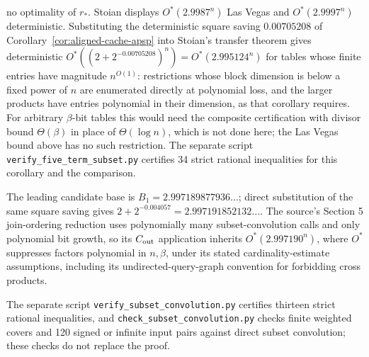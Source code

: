\documentclass[11pt]{article}
\begin{document}
no optimality of $r_*$. Stoian
displays $O^*(2.9987^n)$ Las Vegas and $O^*(2.9997^n)$ deterministic.
Substituting the deterministic square saving $0.00705208$ of
Corollary~\ref{cor:aligned-cache-apsp} into Stoian's transfer theorem
gives deterministic $O^*((2+2^{-0.00705208})^n)=O^*(2.995124^n)$ for
tables whose finite entries have magnitude $n^{O(1)}$: restrictions whose
block dimension is below a fixed power of $n$ are enumerated directly at
polynomial loss, and the larger products have entries polynomial in their
dimension, as that corollary requires. For arbitrary $\beta$-bit tables this
would need the composite certification with divisor bound
$\Theta(\beta)$ in place of $\Theta(\log n)$, which is not done here; the
Las Vegas bound above has no such restriction. The separate script
\texttt{verify\_five\_\allowbreak term\_\allowbreak subset.py} certifies
34 strict rational inequalities for this corollary and the comparison.

The leading candidate base is
$B_1=2.997189877936\ldots$; direct substitution of the same square
saving gives $2+2^{-0.004057}=2.997191852132\ldots$.
The source's Section 5 join-ordering reduction uses polynomially many
subset-convolution calls and only polynomial bit growth, so its
$C_{\rm out}$ application inherits $O^*(2.997190^n)$, where $O^*$
suppresses factors polynomial in $n,\beta$, under its stated
cardinality-estimate assumptions, including its undirected-query-graph
convention for forbidding cross products.

The separate script \texttt{verify\_subset\_\allowbreak convolution.py}
certifies thirteen strict rational inequalities, and
\texttt{check\_subset\_\allowbreak convolution.py} checks finite weighted
covers and 120 signed or infinite input pairs against direct subset
convolution; these checks do not replace the proof.
\end{document}
